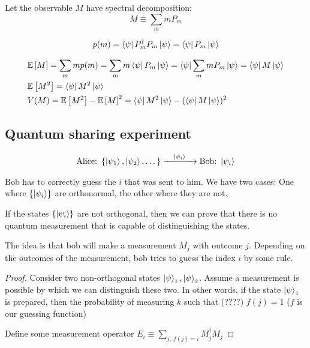 Let the observable $M$ have spectral decomposition: $$M \equiv \sum_m m P_m$$

\begin{align*}
    p(m) = \bra{\psi} P_m^\dagger P_m \ket{\psi} = \bra{\psi} P_m \ket{\psi}
\end{align*}

\begin{align*}
    &\mathbb{E}\left[ M \right] = \sum_m m p(m) 
    = \sum_m m \bra{\psi} P_m \ket{\psi} 
    = \bra{\psi} \sum_m m P_m \ket{\psi} 
    = \bra{\psi} M \ket{\psi}
    \\
    &\mathbb{E}\left[ M^2 \right] = \bra{\psi} M^2 \ket{\psi}
    \\
    &V(M) = \mathbb{E}\left[ M^2 \right] - \mathbb{E}\left[ M \right]^2 
    = \bra \psi M^2 \ket \psi - (\bra \psi M \ket \psi)^2
\end{align*}

\subsection{Quantum sharing experiment}
\begin{align*}
    \text{Alice:}~ 
    \left\{ \ket{\psi_1}, \ket{\psi_2}, \dots \right\} 
    \xrightarrow{\quad \ket{\psi_i} \quad} 
    \text{Bob:}~ \ket{\psi_i}
\end{align*}

Bob has to correctly guess the $i$ that was sent to him. We have two cases:
One where $\{ \ket{\psi_i} \}$ are orthonormal, the other where they are not.

If the states $\{ \ket{\psi_i} \}$ are not orthogonal, then we can prove
that there is no quantum measurement that is capable of distinguishing
the states.

The idea is that bob will make a measurement $M_j$ with outcome $j$.
Depending on the outcomes of the measurement, bob tries to guess the index 
$i$ by some rule.

\begin{proof}
Consider two non-orthogonal states $\ket \psi_1, \ket \psi_2$. Assume a measurement
is possible by which we can distinguish these two. In other words, if the state
$\ket \psi_1$ is prepared, then the probability of measuring $k$ such that 
(????) $f(j) = 1$ ($f$ is our guessing function)

Define some measurement operator $E_i \equiv \sum_{j,~f(j) = i} M_j^\dagger M_j$


\end{proof}

